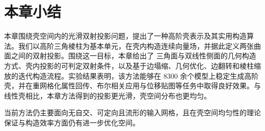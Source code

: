 \section{本章小结}\label{sec:conclusion}
本章围绕壳空间内的光滑双射投影问题，提出了一种高阶壳表示及其实用构造算法。我们以高阶三角棱柱为基本单元，在壳内构造连续向量场，并据此定义两张曲面之间的双射投影。围绕这一目标，本章给出了 \Bezier 三角面与双线性侧面的几何构造方式、壳内投影的可判定双射条件，以及基于边塌缩、几何优化、边翻转和棱柱缩放的迭代构造流程。实验结果表明，该方法能够在 8300 余个模型上稳定生成高阶壳，并在重网格化属性回传、布尔相关应用与位移贴图等任务中取得良好效果。与线性壳相比，本章方法得到的投影更光滑，壳空间分布也更均匀。

当前方法仍主要面向无自交、可定向且流形的输入网格，且在壳空间均匀性的理论保证与构造效率方面仍有进一步优化空间。

